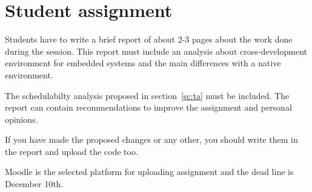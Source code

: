\chapter{Student assignment}

Students have to write a brief report of about 2-3 pages about the work done during the session. This report must include an analysis about cross-development environment for embedded systems and the main differences with a native environment.

The schedulabilty analysis proposed in section~\ref{sc:ta} must be included.
The report can contain recommendations to improve the assignment and personal opinions.

If you have made the proposed changes or any other, you should write them in the report and upload the code too.

Moodle is the selected platform for uploading assignment and the dead line is December 10th.
